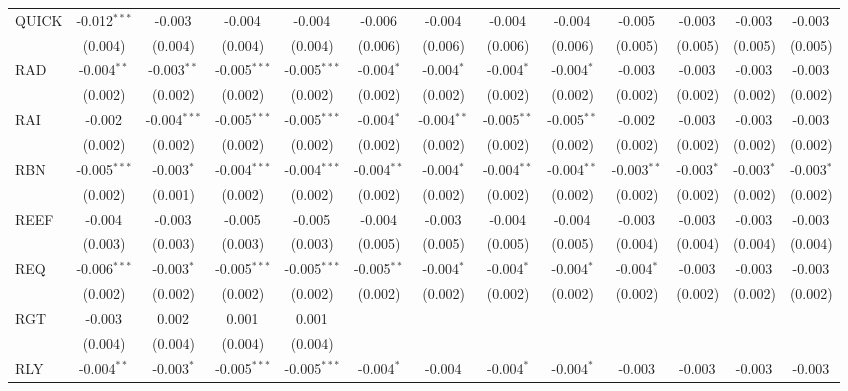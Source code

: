 \begin{table}[!htbp]
\begin{tabular}{@{\extracolsep{5pt}}lcccccccccccc}
 QUICK & -0.012$^{***}$ & -0.003$^{}$ & -0.004$^{}$ & -0.004$^{}$ & -0.006$^{}$ & -0.004$^{}$ & -0.004$^{}$ & -0.004$^{}$ & -0.005$^{}$ & -0.003$^{}$ & -0.003$^{}$ & -0.003$^{}$ \\
  & (0.004) & (0.004) & (0.004) & (0.004) & (0.006) & (0.006) & (0.006) & (0.006) & (0.005) & (0.005) & (0.005) & (0.005) \\
 RAD & -0.004$^{**}$ & -0.003$^{**}$ & -0.005$^{***}$ & -0.005$^{***}$ & -0.004$^{*}$ & -0.004$^{*}$ & -0.004$^{*}$ & -0.004$^{*}$ & -0.003$^{}$ & -0.003$^{}$ & -0.003$^{}$ & -0.003$^{}$ \\
  & (0.002) & (0.002) & (0.002) & (0.002) & (0.002) & (0.002) & (0.002) & (0.002) & (0.002) & (0.002) & (0.002) & (0.002) \\
 RAI & -0.002$^{}$ & -0.004$^{***}$ & -0.005$^{***}$ & -0.005$^{***}$ & -0.004$^{*}$ & -0.004$^{**}$ & -0.005$^{**}$ & -0.005$^{**}$ & -0.002$^{}$ & -0.003$^{}$ & -0.003$^{}$ & -0.003$^{}$ \\
  & (0.002) & (0.002) & (0.002) & (0.002) & (0.002) & (0.002) & (0.002) & (0.002) & (0.002) & (0.002) & (0.002) & (0.002) \\
 RBN & -0.005$^{***}$ & -0.003$^{*}$ & -0.004$^{***}$ & -0.004$^{***}$ & -0.004$^{**}$ & -0.004$^{*}$ & -0.004$^{**}$ & -0.004$^{**}$ & -0.003$^{**}$ & -0.003$^{*}$ & -0.003$^{*}$ & -0.003$^{*}$ \\
  & (0.002) & (0.001) & (0.002) & (0.002) & (0.002) & (0.002) & (0.002) & (0.002) & (0.002) & (0.002) & (0.002) & (0.002) \\
 REEF & -0.004$^{}$ & -0.003$^{}$ & -0.005$^{}$ & -0.005$^{}$ & -0.004$^{}$ & -0.003$^{}$ & -0.004$^{}$ & -0.004$^{}$ & -0.003$^{}$ & -0.003$^{}$ & -0.003$^{}$ & -0.003$^{}$ \\
  & (0.003) & (0.003) & (0.003) & (0.003) & (0.005) & (0.005) & (0.005) & (0.005) & (0.004) & (0.004) & (0.004) & (0.004) \\
 REQ & -0.006$^{***}$ & -0.003$^{*}$ & -0.005$^{***}$ & -0.005$^{***}$ & -0.005$^{**}$ & -0.004$^{*}$ & -0.004$^{*}$ & -0.004$^{*}$ & -0.004$^{*}$ & -0.003$^{}$ & -0.003$^{}$ & -0.003$^{}$ \\
  & (0.002) & (0.002) & (0.002) & (0.002) & (0.002) & (0.002) & (0.002) & (0.002) & (0.002) & (0.002) & (0.002) & (0.002) \\
 RGT & -0.003$^{}$ & 0.002$^{}$ & 0.001$^{}$ & 0.001$^{}$ & & & & & & & & \\
  & (0.004) & (0.004) & (0.004) & (0.004) & & & & & & & & \\
 RLY & -0.004$^{**}$ & -0.003$^{*}$ & -0.005$^{***}$ & -0.005$^{***}$ & -0.004$^{*}$ & -0.004$^{}$ & -0.004$^{*}$ & -0.004$^{*}$ & -0.003$^{}$ & -0.003$^{}$ & -0.003$^{}$ & -0.003$^{}$ \\

\end{tabular}
\end{table}
